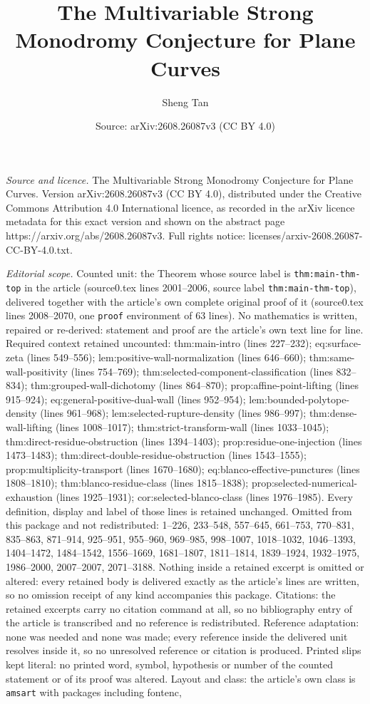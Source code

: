 \documentclass[10pt,a4paper]{amsart}
\title[The Multivariable Strong Monodromy Conjecture for Plane Curv]{The Multivariable Strong Monodromy Conjecture for Plane Curves}
\author{Sheng Tan}
\date{Source: arXiv:2608.26087v3 (CC BY 4.0)}
\begin{document}
\maketitle

\noindent\emph{Source and licence.} The Multivariable Strong Monodromy Conjecture for Plane Curves. Version arXiv:2608.26087v3 (CC BY 4.0), distributed under the Creative Commons Attribution 4.0 International licence, as recorded in the arXiv licence metadata for this exact version and shown on the abstract page https://arxiv.org/abs/2608.26087v3. Full rights notice: licenses/arxiv-2608.26087-CC-BY-4.0.txt.\par\smallskip

\noindent\textit{Editorial scope.} Counted unit: the Theorem whose source label is \texttt{thm:main-thm-top} in the article (source0.tex lines 2001--2006, source label \texttt{thm:main-thm-top}), delivered together with the article's own complete original proof of it (source0.tex lines 2008--2070, one \texttt{proof} environment of 63 lines). No mathematics is written, repaired or re-derived: statement and proof are the article's own text line for line. Required context retained uncounted: thm:main-intro (lines 227--232); eq:surface-zeta (lines 549--556); lem:positive-wall-normalization (lines 646--660); thm:same-wall-positivity (lines 754--769); thm:selected-component-classification (lines 832--834); thm:grouped-wall-dichotomy (lines 864--870); prop:affine-point-lifting (lines 915--924); eq:general-positive-dual-wall (lines 952--954); lem:bounded-polytope-density (lines 961--968); lem:selected-rupture-density (lines 986--997); thm:dense-wall-lifting (lines 1008--1017); thm:strict-transform-wall (lines 1033--1045); thm:direct-residue-obstruction (lines 1394--1403); prop:residue-one-injection (lines 1473--1483); thm:direct-double-residue-obstruction (lines 1543--1555); prop:multiplicity-transport (lines 1670--1680); eq:blanco-effective-punctures (lines 1808--1810); thm:blanco-residue-class (lines 1815--1838); prop:selected-numerical-exhaustion (lines 1925--1931); cor:selected-blanco-class (lines 1976--1985). Every definition, display and label of those lines is retained unchanged. Omitted from this package and not redistributed: 1--226, 233--548, 557--645, 661--753, 770--831, 835--863, 871--914, 925--951, 955--960, 969--985, 998--1007, 1018--1032, 1046--1393, 1404--1472, 1484--1542, 1556--1669, 1681--1807, 1811--1814, 1839--1924, 1932--1975, 1986--2000, 2007--2007, 2071--3188. Nothing inside a retained excerpt is omitted or altered: every retained body is delivered exactly as the article's lines are written, so no omission receipt of any kind accompanies this package. Citations: the retained excerpts carry no citation command at all, so no bibliography entry of the article is transcribed and no reference is redistributed. Reference adaptation: none was needed and none was made; every reference inside the delivered unit resolves inside it, so no unresolved reference or citation is produced. Printed slips kept literal: no printed word, symbol, hypothesis or number of the counted statement or of its proof was altered. Layout and class: the article's own class is \texttt{amsart} with packages including fontenc, 
\end{document}
